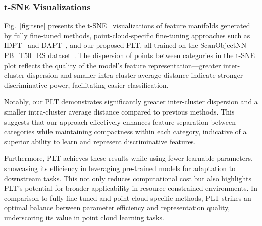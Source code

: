 \subsubsection{t-SNE Visualizations}  
Fig.~\ref{fig:tsne} presents the t-SNE~\cite{van2008visualizing} visualizations of feature manifolds generated by fully fine-tuned methods, point-cloud-specific fine-tuning approaches such as IDPT~\cite{zha2023instance} and DAPT~\cite{zhou2024dynamic}, and our proposed PLT, all trained on the ScanObjectNN PB\_T50\_RS dataset~\cite{uy2019revisiting}. The dispersion of points between categories in the t-SNE plot reflects the quality of the model's feature representation—greater inter-cluster dispersion and smaller intra-cluster average distance indicate stronger discriminative power, facilitating easier classification.

Notably, our PLT demonstrates significantly greater inter-cluster dispersion and a smaller intra-cluster average distance compared to previous methods. This suggests that our approach effectively enhances feature separation between categories while maintaining compactness within each category, indicative of a superior ability to learn and represent discriminative features.

Furthermore, PLT achieves these results while using fewer learnable parameters, showcasing its efficiency in leveraging pre-trained models for adaptation to downstream tasks. This not only reduces computational cost but also highlights PLT's potential for broader applicability in resource-constrained environments. In comparison to fully fine-tuned and point-cloud-specific methods, PLT strikes an optimal balance between parameter efficiency and representation quality, underscoring its value in point cloud learning tasks.




